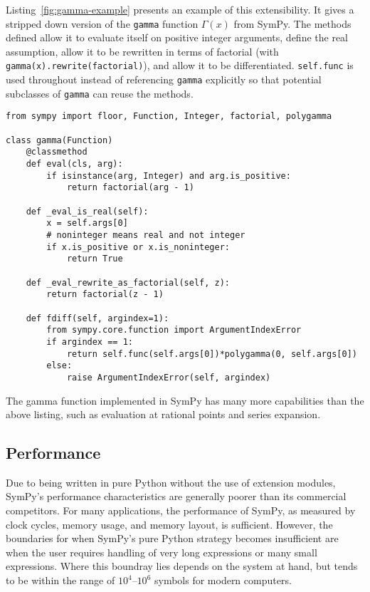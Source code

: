 Listing~\ref{fig:gamma-example} presents an example of this extensibility. It
gives a stripped down version of the \texttt{gamma} function $\Gamma(x)$ from
SymPy. The methods defined allow it to evaluate itself on positive integer
arguments, define the real assumption, allow it to be rewritten in terms of
factorial (with \verb|gamma(x).rewrite(factorial)|), and allow it to be
differentiated. \texttt{self.func} is used throughout instead of referencing
\texttt{gamma} explicitly so that potential subclasses of \texttt{gamma} can
reuse the methods.

\lstset{
  basicstyle=\ttfamily,
}

\begin{lstlisting}[caption={A minimal implementation of \texttt{sympy.gamma}.},label=fig:gamma-example]
from sympy import floor, Function, Integer, factorial, polygamma

class gamma(Function)
    @classmethod
    def eval(cls, arg):
        if isinstance(arg, Integer) and arg.is_positive:
            return factorial(arg - 1)

    def _eval_is_real(self):
        x = self.args[0]
        # noninteger means real and not integer
        if x.is_positive or x.is_noninteger:
            return True

    def _eval_rewrite_as_factorial(self, z):
        return factorial(z - 1)

    def fdiff(self, argindex=1):
        from sympy.core.function import ArgumentIndexError
        if argindex == 1:
            return self.func(self.args[0])*polygamma(0, self.args[0])
        else:
            raise ArgumentIndexError(self, argindex)
\end{lstlisting}
The gamma function implemented in SymPy has many more capabilities than the
above listing, such as evaluation at rational points and series expansion.


\subsection{Performance}
\label{sec:performance}

Due to being written in pure Python without the use of extension modules,
SymPy's performance characteristics are generally poorer than
its commercial competitors. For many applications,
the performance of SymPy, as measured by clock cycles, memory usage, and memory
layout, is sufficient.
However, the boundaries for when SymPy's pure Python strategy becomes
insufficient are when the user requires handling of very long expressions or many
small expressions. Where this boundray lies depends on the system at hand, but tends
to be within the range of $10^4$--$10^6$ symbols for modern computers.

